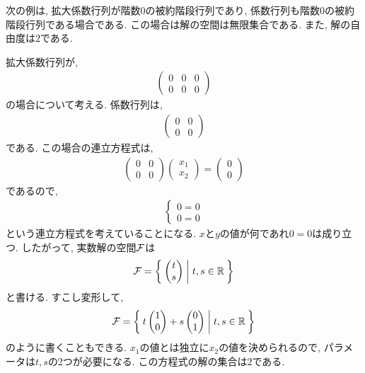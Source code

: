 次の例は,
拡大係数行列が階数$0$の被約階段行列であり,
係数行列も階数$0$の被約階段行列である場合である.
この場合は解の空間は無限集合である.
また, 解の自由度は$2$である.
\begin{example}
      \label{eg:eq:reduced:7}
  拡大係数行列が,
  \begin{align*}
    \begin{pmatrix}
      0&0&0\\0&0&0
    \end{pmatrix}
  \end{align*}
  の場合について考える.
  係数行列は,
  \begin{align*}
    \begin{pmatrix}
      0&0\\0&0
    \end{pmatrix}
  \end{align*}
  である.
この場合の連立方程式は,
  \begin{align*}
    \begin{pmatrix}
      0&0\\0&0
    \end{pmatrix}
    \begin{pmatrix}x_1\\x_2\end{pmatrix}
      =
      \begin{pmatrix}
        0\\0
      \end{pmatrix}
  \end{align*}
  であるので,
  \begin{align*}
    \begin{cases}
      0=0\\
      0=0
    \end{cases}
  \end{align*}
  という連立方程式を考えていることになる.
  $x$と$y$の値が何であれ$0=0$は成り立つ.
  したがって, 実数解の空間$\mathcal{F}$は
  \begin{align*}
    \mathcal{F}=
    \Set{
      \begin{pmatrix}t\\s\end{pmatrix}
        |t,s\in\mathbb{R}}
  \end{align*}
  と書ける. 
  すこし変形して,
  \begin{align*}
    \mathcal{F}=\Set{
      t\begin{pmatrix}1\\0\end{pmatrix}
        +
        s\begin{pmatrix}0\\1\end{pmatrix}
        |t,s\in\mathbb{R}}
  \end{align*}
  のように書くこともできる.
  $x_1$の値とは独立に$x_2$の値を決められるので,
  パラメータは$t,s$の2つが必要になる.
  この方程式の解の集合は$2$である.
\end{example}





